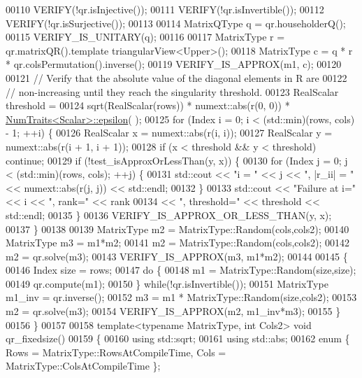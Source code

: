 \begin{DoxyCode}
00110   VERIFY(!qr.isInjective());
00111   VERIFY(!qr.isInvertible());
00112   VERIFY(!qr.isSurjective());
00113 
00114   MatrixQType q = qr.householderQ();
00115   VERIFY\_IS\_UNITARY(q);
00116 
00117   MatrixType r = qr.matrixQR().template triangularView<Upper>();
00118   MatrixType c = q * r * qr.colsPermutation().inverse();
00119   VERIFY\_IS\_APPROX(m1, c);
00120 
00121   \textcolor{comment}{// Verify that the absolute value of the diagonal elements in R are}
00122   \textcolor{comment}{// non-increasing until they reach the singularity threshold.}
00123   RealScalar threshold =
00124       sqrt(RealScalar(rows)) * numext::abs(r(0, 0)) * \hyperlink{group___core___module_struct_eigen_1_1_num_traits}{NumTraits<Scalar>::epsilon}(
      );
00125   \textcolor{keywordflow}{for} (Index i = 0; i < (std::min)(rows, cols) - 1; ++i) \{
00126     RealScalar x = numext::abs(r(i, i));
00127     RealScalar y = numext::abs(r(i + 1, i + 1));
00128     \textcolor{keywordflow}{if} (x < threshold && y < threshold) \textcolor{keywordflow}{continue};
00129     \textcolor{keywordflow}{if} (!test\_isApproxOrLessThan(y, x)) \{
00130       \textcolor{keywordflow}{for} (Index j = 0; j < (std::min)(rows, cols); ++j) \{
00131         std::cout << \textcolor{stringliteral}{"i = "} << j << \textcolor{stringliteral}{", |r\_ii| = "} << numext::abs(r(j, j)) << std::endl;
00132       \}
00133       std::cout << \textcolor{stringliteral}{"Failure at i="} << i << \textcolor{stringliteral}{", rank="} << rank
00134                 << \textcolor{stringliteral}{", threshold="} << threshold << std::endl;
00135     \}
00136     VERIFY\_IS\_APPROX\_OR\_LESS\_THAN(y, x);
00137   \}
00138 
00139   MatrixType m2 = MatrixType::Random(cols,cols2);
00140   MatrixType m3 = m1*m2;
00141   m2 = MatrixType::Random(cols,cols2);
00142   m2 = qr.solve(m3);
00143   VERIFY\_IS\_APPROX(m3, m1*m2);
00144 
00145   \{
00146     Index size = rows;
00147     \textcolor{keywordflow}{do} \{
00148       m1 = MatrixType::Random(size,size);
00149       qr.compute(m1);
00150     \} \textcolor{keywordflow}{while}(!qr.isInvertible());
00151     MatrixType m1\_inv = qr.inverse();
00152     m3 = m1 * MatrixType::Random(size,cols2);
00153     m2 = qr.solve(m3);
00154     VERIFY\_IS\_APPROX(m2, m1\_inv*m3);
00155   \}
00156 \}
00157 
00158 \textcolor{keyword}{template}<\textcolor{keyword}{typename} MatrixType, \textcolor{keywordtype}{int} Cols2> \textcolor{keywordtype}{void} qr\_fixedsize()
00159 \{
00160   \textcolor{keyword}{using} std::sqrt;
00161   \textcolor{keyword}{using} std::abs;
00162   \textcolor{keyword}{enum} \{ Rows = MatrixType::RowsAtCompileTime, Cols = MatrixType::ColsAtCompileTime \};

\end{DoxyCode}
